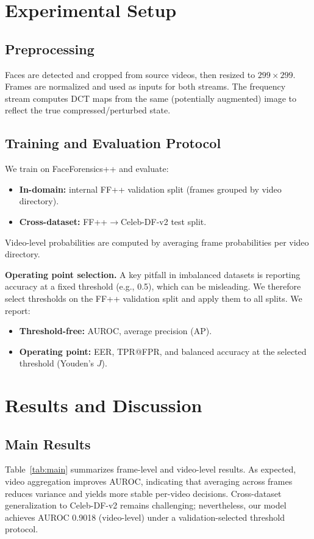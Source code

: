 \documentclass[conference]{IEEEtran}
\begin{document}
\section{Experimental Setup}
\subsection{Preprocessing}
Faces are detected and cropped from source videos, then resized to $299 \times 299$. Frames are normalized and used as inputs for both streams. The frequency stream computes DCT maps from the same (potentially augmented) image to reflect the true compressed/perturbed state.

\subsection{Training and Evaluation Protocol}
We train on FaceForensics++ and evaluate:
\begin{itemize}
  \item \textbf{In-domain:} internal FF++ validation split (frames grouped by video directory).
  \item \textbf{Cross-dataset:} FF++$\rightarrow$Celeb-DF-v2 test split.
\end{itemize}
Video-level probabilities are computed by averaging frame probabilities per video directory.

\textbf{Operating point selection.} A key pitfall in imbalanced datasets is reporting accuracy at a fixed threshold (e.g., 0.5), which can be misleading. We therefore select thresholds on the FF++ validation split and apply them to all splits. We report:
\begin{itemize}
  \item \textbf{Threshold-free:} AUROC, average precision (AP).
  \item \textbf{Operating point:} EER, TPR@FPR, and balanced accuracy at the selected threshold (Youden's $J$).
\end{itemize}

\section{Results and Discussion}
\subsection{Main Results}
Table~\ref{tab:main} summarizes frame-level and video-level results. As expected, video aggregation improves AUROC, indicating that averaging across frames reduces variance and yields more stable per-video decisions. Cross-dataset generalization to Celeb-DF-v2 remains challenging; nevertheless, our model achieves AUROC 0.9018 (video-level) under a validation-selected threshold protocol.
\end{document}
